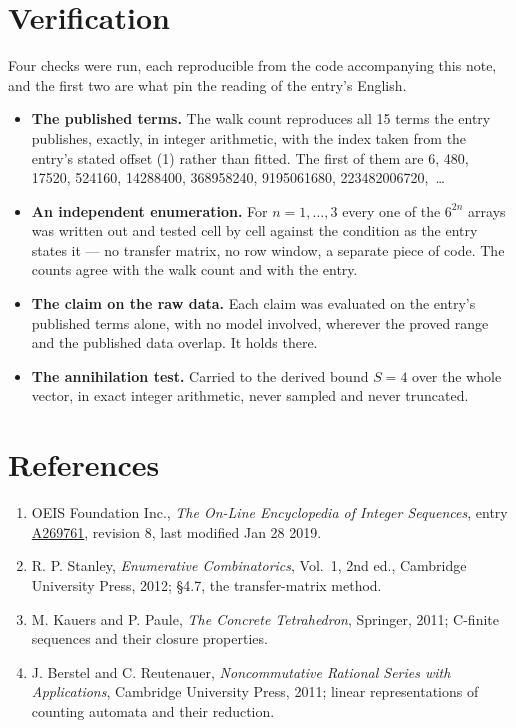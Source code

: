 \documentclass[11pt]{article}
\theoremstyle{definition}
\begin{document}
\section{Verification}

Four checks were run, each reproducible from the code accompanying this note, and the first two are what pin the reading of the entry's English.

\begin{itemize}

\item {\bfseries The published terms.} The walk count reproduces all 15 terms the entry publishes, exactly, in integer arithmetic, with the index taken from the entry's stated offset (1) rather than fitted. The first of them are 6, 480, 17520, 524160, 14288400, 368958240, 9195061680, 223482006720,~\dots

\item {\bfseries An independent enumeration.} For $n = 1,\dots,3$ every one of the $6^{2n}$ arrays was written out and tested cell by cell against the condition as the entry states it --- no transfer matrix, no row window, a separate piece of code. The counts agree with the walk count and with the entry.

\item {\bfseries The claim on the raw data.} Each claim was evaluated on the entry's published terms alone, with no model involved, wherever the proved range and the published data overlap. It holds there.

\item {\bfseries The annihilation test.} Carried to the derived bound $S = 4$ over the whole vector, in exact integer arithmetic, never sampled and never truncated.

\end{itemize}

\section{References}

\begin{enumerate}

\item OEIS Foundation Inc., \emph{The On-Line Encyclopedia of Integer Sequences}, entry \href{https://oeis.org/A269761}{A269761}, revision 8, last modified Jan 28 2019.

\item R. P. Stanley, \emph{Enumerative Combinatorics}, Vol.~1, 2nd ed., Cambridge University Press, 2012; \S4.7, the transfer-matrix method.

\item M. Kauers and P. Paule, \emph{The Concrete Tetrahedron}, Springer, 2011; C-finite sequences and their closure properties.

\item J. Berstel and C. Reutenauer, \emph{Noncommutative Rational Series with Applications}, Cambridge University Press, 2011; linear representations of counting automata and their reduction.

\end{enumerate}
\end{document}
